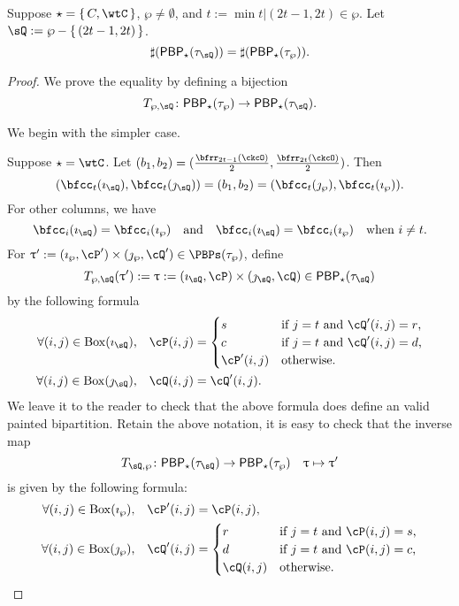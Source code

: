\documentclass[counting_main.tex]{subfiles}
\begin{document}
\begin{lem}
  Suppose $\star = \set{C,\wtC}$, $\wp\neq \emptyset$, and $t:=\min{t|(2t-1,2t)\in \wp}$.
  Let $\sQ:=\wp - \set{(2t-1,2t)}$.
  \[
  \sharp(\PBP_{\star}(\tau_{\sQ})) = \sharp(\PBP_{\star}(\tau_{\wp})).
  \]
\end{lem}
\begin{proof}
  We prove the equality by defining a bijection
  \[
    T_{\wp,\sQ}\colon \PBP_{\star}(\tau_{\wp}) \rightarrow \PBP_{\star}(\tau_{\sQ}).
  \]

  We begin with the simpler case.

  Suppose $\star = \wtC$. Let
  $(b_{1},b_{2}) = (\frac{\bfrr_{2t-1}(\ckcO)}{2},\frac{\bfrr_{2t}(\ckcO)}{2})$.
  Then
  \[
    (\bfcc_{t}(\imath_{\sQ}), \bfcc_{t}(\jmath_{\sQ})) = (b_{1},b_{2})= (\bfcc_{t}(\jmath_{\wp}), \bfcc_{t}(\imath_{\wp})).
  \]
  For other columns, we have
  \[
    \bfcc_{i}(\imath_{\sQ}) = \bfcc_{i}(\imath_{\wp}) \AND \bfcc_{i}(\imath_{\sQ}) = \bfcc_{i}(\imath_{\wp})\quad \text{when
      $i\neq t$}.
  \]
  For
  $\uptau': = (\imath_{\wp},\cP')\times (\jmath_{\wp},\cQ')\in \PBPs(\tau_{\wp})$,
  define
  \[
  T_{\wp,\sQ}(\uptau'):=\uptau := (\imath_{\sQ},\cP)\times (\jmath_{\sQ},\cQ)\in \PBP_{\star}(\tau_{\sQ})
  \]
  by the following formula
  \[
    \begin{split}
      \text{$\forall (i,j)\in \BOX{\imath_{\sQ}}$,} \quad \cP(i,j) &= \begin{cases}
        s& \text{if $j=t$ and  $\cQ'(i,j)=r$,}\\
        c& \text{if $j=t$ and  $\cQ'(i,j)=d$,}\\
        \cP'(i,j) &\text{otherwise.}
      \end{cases}\\
      \text{$\forall (i,j)\in \BOX{\jmath_{\sQ}}$,} \quad   \cQ(i,j) &=  \cQ'(i,j).\\
    \end{split}
  \]
  We leave it to the reader to check that the above formula does define an valid
  painted bipartition. Retain the above notation, it is easy to check that
  the inverse map
  \[
    T_{\sQ,\wp}\colon \PBP_{\star}(\tau_{\sQ}) \rightarrow \PBP_{\star}(\tau_{\wp})\quad
    \uptau \mapsto \uptau'
  \]
  is given by the following formula:
  \[
    \begin{split}
      \text{$\forall (i,j)\in \BOX{\imath_{\wp}}$,} \quad   \cP'(i,j) &=  \cP(i,j),\\
      \text{$\forall (i,j)\in \BOX{\jmath_{\wp}}$,} \quad \cQ'(i,j) &= \begin{cases}
        r& \text{if $j=t$ and  $\cP(i,j)=s$,}\\
        d& \text{if $j=t$ and  $\cP(i,j)=c$,}\\
        \cQ(i,j) &\text{otherwise.}
      \end{cases}
    \end{split}
  \]
\end{proof}
\end{document}
